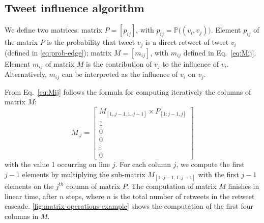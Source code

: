 

\subsection{Tweet influence algorithm}

We define two matrices:
matrix $P = [ p_{ij} ]$, with $p_{ij} = \mathds{P}\big((v_i, v_j)\big)$.
Element $p_{ij}$ of the matrix $P$ is the probability that tweet $v_j$ is a direct retweet of tweet $v_i$ (defined in \cref{eq:prob-edge});
matrix $M = [ m_{ij} ]$, with $m_{ij}$ defined in Eq.~\eqref{eq:Mij}.
Element $m_{ij}$ of matrix $M$ is the contribution of $v_j$ to the influence of $v_i$.
Alternatively, $m_{ij}$ can be interpreted as the influence of $v_i$ on $v_j$.

From Eq.~\eqref{eq:Mij} follows the formula for computing iteratively the columns of matrix $M$:
\begin{equation} \label{eq:Mij-matrix}
M_{ \cdot j}=
\left[
\begin{array}{c}
M_{[1..j-1, 1..j-1]} \times P_{[1:j-1,j]} \\
1 \\
0 \\
0 \\
\vdots \\
0 
\end{array}
\right]
\end{equation}
with the value 1 occurring on line $j$.
For each column $j$, we compute the first $j-1$ elements by multiplying the sub-matrix $M_{[1..j-1, 1..j-1]}$ with the first $j-1$ elements on the $j^{th}$ column of matrix $P$.
The computation of matrix $M$ finishes in linear time, after $n$ steps, where $n$ is the total number of retweets in the retweet cascade.
\cref{fig:matrix-operations-example} shows the computation of the first four columns in $M$.
